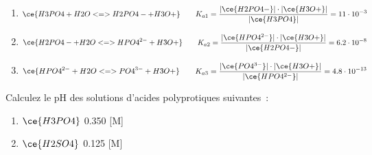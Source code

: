 \documentclass[
  11pt,
  french,
  a4paper,
  openany]{book}
\providecommand{\tightlist}{%
  \setlength{\itemsep}{0pt}\setlength{\parskip}{0pt}}
\begin{document}
\begin{Answer}

\begin{enumerate}
\def\labelenumi{\arabic{enumi}.}
\tightlist
\item
  \[
  \begin{split}
  \ce{H3PO4 + H2O <=> H2PO4- + H3O+}
  \end{split}
  \qquad
  \begin{split}
  K_{a1} = \frac{|\ce{H2PO4-}| \cdot |\ce{H3O+}|}{|\ce{H3PO4}|} = 11 \cdot 10^{-3}
  \end{split}
  \]
\item
  \[
  \begin{split}
  \ce{H2PO4- + H2O <=> HPO4^{2-} + H3O+}
  \end{split}
  \qquad
  \begin{split}
  K_{a2} = \frac{|\ce{HPO4^{2-}}| \cdot |\ce{H3O+}|}{|\ce{H2PO4-}|} = 6.2 \cdot 10^{-8}
  \end{split}
  \]
\item
  \[
  \begin{split}
  \ce{HPO4^{2-} + H2O <=> PO4^{3-} + H3O+}
  \end{split}
  \qquad
  \begin{split}
  K_{a3} = \frac{|\ce{PO4^{3-}}| \cdot |\ce{H3O+}|}{|\ce{HPO4^{2-}}|} = 4.8 \cdot 10^{-13}
  \end{split}
  \]
\end{enumerate}


\end{Answer}

\clearpage

\begin{Exercise}

Calculez le pH des solutions d'acides polyprotiques suivantes~:

\begin{enumerate}
\def\labelenumi{\alph{enumi}.}
\tightlist
\item
  \(\ce{H3PO4}\) 0.350 {[}M{]}
\item
  \(\ce{H2SO4}\) 0.125 {[}M{]}
\end{enumerate}


\end{Exercise}
\end{document}
